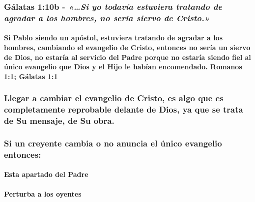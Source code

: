 \documentclass[11a pt,twoside]{article}
\newcommand{\scripture}[1]{%
  {\fontsize{12pt}{16pt}\selectfont\ScriptureFont\itshape #1}%
}
\let\oldsubsubsection\subsubsection
\renewcommand{\subsubsection}{\needspace{4\baselineskip}\oldsubsubsection}
\let\oldparagraph\paragraph
\renewcommand{\paragraph}{\needspace{3\baselineskip}\oldparagraph}
\begin{document}
\subsubsection{\texorpdfstring{Gálatas 1:10b -
\scripture{«…Si yo todavía estuviera tratando de agradar a los hombres, no sería siervo de Cristo.»}}{Gálatas 1:10b - }}\label{guxe1latas-110b---si-yo-todavuxeda-estuviera-tratando-de-agradar-a-los-hombres-no-seruxeda-siervo-de-cristo.}

\paragraph{Si Pablo siendo un apóstol, estuviera tratando de agradar a
los hombres, cambiando el evangelio de Cristo, entonces no sería un
siervo de Dios, no estaría al servicio del Padre porque no estaría
siendo fiel al único evangelio que Dios y el Hijo le habían encomendado.
Romanos 1:1; Gálatas
1:1}\label{si-pablo-siendo-un-apuxf3stol-estuviera-tratando-de-agradar-a-los-hombres-cambiando-el-evangelio-de-cristo-entonces-no-seruxeda-un-siervo-de-dios-no-estaruxeda-al-servicio-del-padre-porque-no-estaruxeda-siendo-fiel-al-uxfanico-evangelio-que-dios-y-el-hijo-le-habuxedan-encomendado.-romanos-11-guxe1latas-11}

\subsubsection{Llegar a cambiar el evangelio de Cristo, es algo que es
completamente reprobable delante de Dios, ya que se trata de Su mensaje,
de Su
obra.}\label{llegar-a-cambiar-el-evangelio-de-cristo-es-algo-que-es-completamente-reprobable-delante-de-dios-ya-que-se-trata-de-su-mensaje-de-su-obra.}

\subsubsection{Si un creyente cambia o no anuncia el único evangelio
entonces:}\label{si-un-creyente-cambia-o-no-anuncia-el-uxfanico-evangelio-entonces}

\paragraph{Esta apartado del Padre}\label{esta-apartado-del-padre}

\paragraph{Perturba a los oyentes}\label{perturba-a-los-oyentes}
\end{document}

